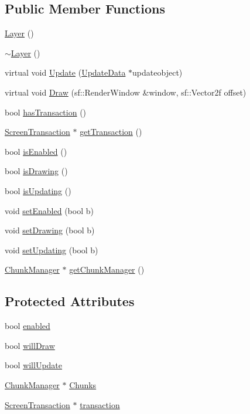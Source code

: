 \subsection*{Public Member Functions}
\begin{DoxyCompactItemize}
\item 
\hyperlink{class_layer_a8f623c7c4737dc29ecc86978d243ac6f}{Layer} ()
\item 
\hyperlink{class_layer_a1b1ba4804451dfe6cc357194e42762ae}{$\sim$\-Layer} ()
\item 
virtual void \hyperlink{class_layer_a6db2f37689d5ee4958167e539ab4ce69}{Update} (\hyperlink{class_update_data}{Update\-Data} $\ast$updateobject)
\item 
virtual void \hyperlink{class_layer_a008068a5a6bd4dd274bb01bf0246cfaf}{Draw} (sf\-::\-Render\-Window \&window, sf\-::\-Vector2f offset)
\item 
bool \hyperlink{class_layer_a36ea9075da50ba00ce591c365f1df947}{has\-Transaction} ()
\item 
\hyperlink{class_screen_transaction}{Screen\-Transaction} $\ast$ \hyperlink{class_layer_a828daf5d76e298c41fbe1d67a680b706}{get\-Transaction} ()
\item 
bool \hyperlink{class_layer_a57c59677e3c56a7fd5e3dc985bdb9b4c}{is\-Enabled} ()
\item 
bool \hyperlink{class_layer_a46a91415e6bdc2fdb75ae0ac8498868f}{is\-Drawing} ()
\item 
bool \hyperlink{class_layer_ac2892b95b2df74446d89e4a6388f0c88}{is\-Updating} ()
\item 
void \hyperlink{class_layer_a68b9de1ac0f3eaa8274b8d0a901a825c}{set\-Enabled} (bool b)
\item 
void \hyperlink{class_layer_a0a4f62b4c031e7c2f2d5635ccd38ddd1}{set\-Drawing} (bool b)
\item 
void \hyperlink{class_layer_a0e0595efe93dbd63b05339f35399d1ad}{set\-Updating} (bool b)
\item 
\hyperlink{class_chunk_manager}{Chunk\-Manager} $\ast$ \hyperlink{class_layer_afbfd549c4d1da2e4a2d78a33586c95e1}{get\-Chunk\-Manager} ()
\end{DoxyCompactItemize}
\subsection*{Protected Attributes}
\begin{DoxyCompactItemize}
\item 
bool \hyperlink{class_layer_af9f9c9a8c4a053bd829a06273df297bd}{enabled}
\item 
bool \hyperlink{class_layer_a64902a81921ba2fc792d044392b14ecc}{will\-Draw}
\item 
bool \hyperlink{class_layer_a8c3badeb437135a265c931f4ee728a48}{will\-Update}
\item 
\hyperlink{class_chunk_manager}{Chunk\-Manager} $\ast$ \hyperlink{class_layer_ab5408f6d27ad51d73df507296f16c811}{Chunks}
\item 
\hyperlink{class_screen_transaction}{Screen\-Transaction} $\ast$ \hyperlink{class_layer_a3f0f6e109409d047c650380b6715c316}{transaction}
\end{DoxyCompactItemize}


